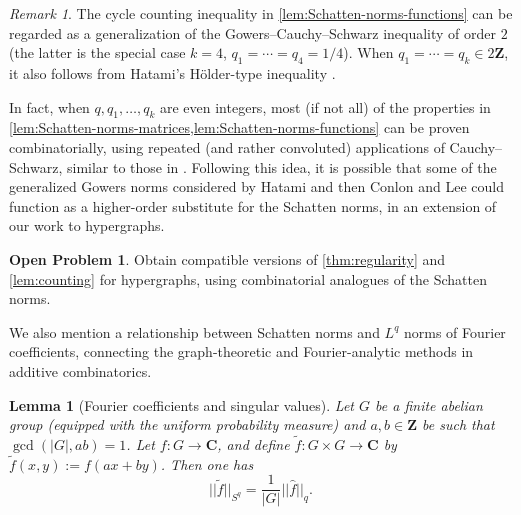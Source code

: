 \documentclass[reqno,11pt]{amsart}
\newtheorem{lemma}[theorem]{Lemma}
\theoremstyle{definition}
\newtheorem{open}[theorem]{Open Problem}
\theoremstyle{remark}
\newtheorem*{remark}{Remark}
\numberwithin{equation}{section}
\newcommand{\Z}{\mathbf{Z}}
\newcommand{\C}{\mathbf{C}}
\renewcommand{\hat}{\widehat}
\renewcommand{\tilde}{\widetilde}
\begin{document}
\begin{remark}
The cycle counting inequality in \cref{lem:Schatten-norms-functions} can be regarded as a generalization of the Gowers--Cauchy--Schwarz inequality of order $2$ (the latter is the special case $k = 4$, $q_1 = \cdots = q_4 = 1/4$). When $q_1 = \cdots = q_k \in 2\Z$, it also follows from Hatami's H\"older-type inequality \cite{hatami2009generalizations}.

In fact, when $q, q_1, \ldots, q_k$ are even integers, most (if not all) of the properties in \cref{lem:Schatten-norms-matrices,lem:Schatten-norms-functions} can be proven combinatorially, using repeated (and rather convoluted) applications of Cauchy--Schwarz, similar to those in \cite{conlon2017finite}. Following this idea, it is possible that some of the generalized Gowers norms considered by Hatami and then Conlon and Lee \cite{hatami2009generalizations,conlon2017finite} could function as a higher-order substitute for the Schatten norms, in an extension of our work to hypergraphs.


\end{remark}

\begin{open}
Obtain compatible versions of \cref{thm:regularity} and \cref{lem:counting} for hypergraphs, using combinatorial analogues of the Schatten norms.
\end{open}

We also mention a relationship between Schatten norms and $L^q$ norms of Fourier coefficients, connecting the graph-theoretic and Fourier-analytic methods in additive combinatorics.

\begin{lemma}[Fourier coefficients and singular values] \label{lem:Fourier-singular}
Let $G$ be a finite abelian group (equipped with the uniform probability measure) and $a, b \in \Z$ be such that $\gcd(|G|, ab) = 1$. Let $f : G \to \C$, and define $\tilde{f} : G \times G \to \C$ by $\tilde{f}(x, y) := f(ax+by)$. Then one has
\[
    ||\tilde{f}||_{S^q} = \frac{1}{|G|} ||\hat{f}||_{q}.
\]
\end{lemma}
\end{document}
